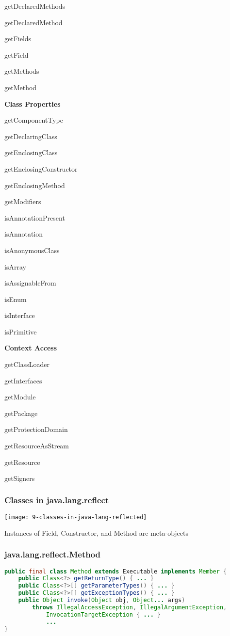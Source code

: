 getDeclaredMethods

getDeclaredMethod

getFields

getField

getMethods

getMethod

\textbf{Class Properties}

getComponentType

getDeclaringClass

getEnclosingClass

getEnclosingConstructor

getEnclosingMethod

getModifiers

isAnnotationPresent

isAnnotation

isAnonymousClass

isArray

isAssignableFrom


isEnum

isInterface

isPrimitive

\textbf{Context Access}

getClassLoader

getInterfaces

getModule

getPackage

getProtectionDomain

getResourceAsStream

getResource

getSigners

\subsubsection{Classes in java.lang.reflect}

\begin{center}
\texttt{[image: 9-classes-in-java-lang-reflected]}
\end{center}

Instances of Field, Constructor, and Method are meta-objects

\subsubsection{java.lang.reflect.Method}

\begin{lstlisting}[language=Java]
public final class Method extends Executable implements Member {
	public Class<?> getReturnType() { ... }
	public Class<?>[] getParameterTypes() { ... }
	public Class<?>[] getExceptionTypes() { ... }
	public Object invoke(Object obj, Object... args)
		throws IllegalAccessException, IllegalArgumentException,
			InvocationTargetException { ... }
			...
}
\end{lstlisting}

